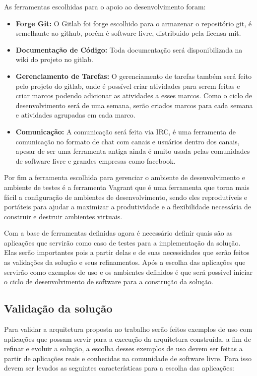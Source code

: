 As ferramentas escolhidas para o apoio ao desenvolvimento foram:
\begin{itemize}
  \item \textbf{Forge Git:} O Gitlab foi forge escolhido para o armazenar o
  repositório git, é semelhante ao github, porém é software livre, distribuido pela
  licensa mit\cite{gitlab}.
  \item \textbf{Documentação de Código:} Toda documentação será disponibilizada
  na wiki do projeto no gitlab.
  \item \textbf{Gerenciamento de Tarefas:} O gerenciamento de tarefas também será
  feito pelo projeto do gitlab, onde é possível criar atividades para serem feitas
  e criar marcos podendo adicionar as atividades a esses marcos. Como o ciclo de
  desenvolvimento será de uma semana, serão criados marcos para cada semana e atividades
  agrupadas em cada marco.
  \item \textbf{Comunicação:} A comunicação será feita via IRC, é uma ferramenta
  de comunicação no formato de chat com canais e usuários dentro dos canais,
  apesar de ser uma ferramenta antiga ainda é muito usada pelas comunidades de software
  livre e grandes empresas como facebook\cite{artigofacebook}.
\end{itemize}

Por fim a ferramenta escolhida para gerenciar o ambiente de desenvolvimento e
ambiente de testes é a ferramenta Vagrant que é uma ferramenta que torna mais fácil
a configuração de ambientes de desenvolvimento, sendo eles reprodutíveis e
portáteis para ajudar a maximizar a produtividade e a flexibilidade necessária
de construir e destruir ambientes virtuais.\cite{vagrant}

Com a base de ferramentas definidas agora é necessário definir quais são as
aplicações que servirão como caso de testes para a implementação da solução. Elas
serão importantes pois a partir delas e de suas necessidades que serão feitos as
validações da solução e seus refinamentos. Após a escolha das aplicações que
servirão como exemplos de uso e os ambientes definidos é que será possivel
iniciar o ciclo de desenvolvimento de software para a construção da solução.

\subsection{Validação da solução}
\label{subsection:validacao}

Para validar a arquitetura proposta no trabalho serão feitos exemplos de uso
com aplicações que possam servir para a execução da arquitetura construída, a
fim de refinar e evoluir a solução, a escolha desses exemplos de uso devem ser
feitas a partir de aplicações reais e conhecidas na comunidade de software livre.
 Para isso devem ser levados as seguintes características para a escolha das aplicações:

